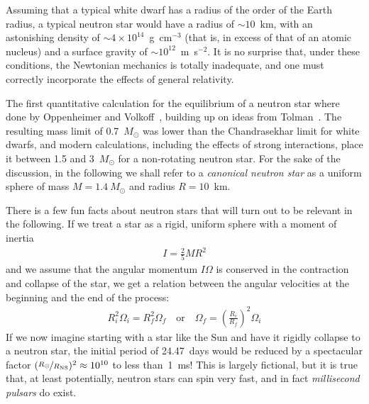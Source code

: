 Assuming that a typical white dwarf has a radius of the order of the Earth radius,
a typical neutron star would have a radius of $\sim 10$~km, with an astonishing density
of $\sim 4 \times 10^{14}$~g~cm$^{-3}$ (that is, in excess of that of an atomic
nucleus) and a surface gravity of $\sim 10^{12}$~m~s$^{-2}$. It is no
surprise that, under these conditions, the Newtonian mechanics is totally inadequate,
and one must correctly incorporate the effects of general relativity.

The first quantitative calculation for the equilibrium of a neutron star where
done by Oppenheimer and Volkoff~\cite{1939PhRv...55..374O}, building up on ideas
from Tolman~\cite{1939PhRv...55..364T}. The resulting mass limit of 0.7~$M_\odot$
was lower than the Chandrasekhar limit for white dwarfs, and modern calculations,
including the effects of strong interactions, place it between 1.5 and 3~$M_\odot$
for a non-rotating neutron star. For the sake of the discussion, in the following
we shall refer to a \emph{canonical neutron star} as a uniform sphere of mass
$M = 1.4~M_\odot$ and radius $R = 10$~km.

There is a few fun facts about neutron stars that will turn out to be relevant
in the following. If we treat a star as a rigid, uniform sphere with a moment of
inertia
\begin{align*}
	I = \frac{2}{5} MR^2
\end{align*}
and we assume that the angular momentum $I\Omega$ is conserved in the contraction
and collapse of the star, we get a relation between the angular velocities at the
beginning and the end of the process:
\begin{align}
	R^2_i \Omega_i = R^2_f \Omega_f
	\quad \text{or} \quad
	\Omega_f = \left( \frac{R_i}{R_f} \right)^2 \Omega_i
\end{align}
If we now imagine starting with a star like the Sun and have it rigidly collapse
to a neutron star, the initial period of 24.47~days would be reduced by a spectacular
factor $(\nicefrac{R_\odot}{R_\text{NS}})^2 \approx 10^{10}$ to less than~1~ms!
This is largely fictional, but it is true that, at least potentially, neutron stars
can spin very fast, and in fact \emph{millisecond pulsars} do exist.

